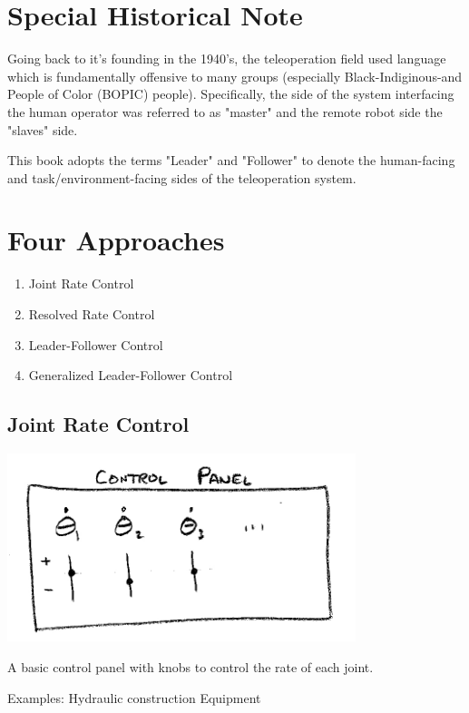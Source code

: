 \section{Special Historical Note}
Going back to it's founding in the 1940's, the teleoperation field used language
which is fundamentally offensive to many groups (especially Black-Indiginous-and People
of Color (BOPIC) people).  Specifically, the side of the system interfacing the 
human operator was referred to as "master" and the remote robot side the "slaves" side. 

This book adopts the terms "Leader" and "Follower" to denote the human-facing and 
task/environment-facing sides of the teleoperation system. 


\section{Four Approaches}
\begin{enumerate}
	\item Joint Rate Control
	\item Resolved Rate Control
	\item Leader-Follower Control
	\item Generalized Leader-Follower Control
\end{enumerate}


\subsection{Joint Rate Control}

\includegraphics[width=4.0in]{figs14/00398.jpg}

A basic control panel with knobs to control the rate of each joint.

Examples:   Hydraulic construction Equipment

